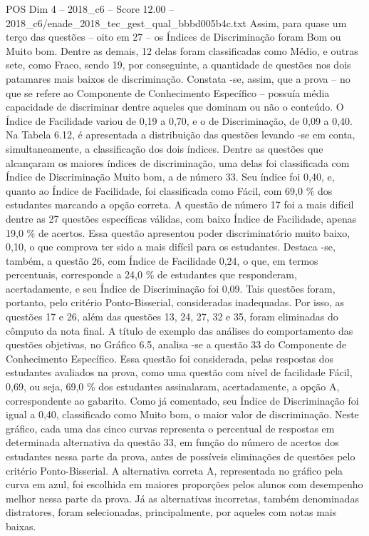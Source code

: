 \begin{textsample}{POS Dim 4 – 2018\_c6 – Score 12.00 – 2018\_c6/enade\_2018\_tec\_gest\_qual\_bbbd005b4c.txt}
Assim, para quase um terço das questões – oito em 27 – os Índices de Discriminação foram Bom ou Muito bom.
Dentre as demais, 12 delas foram classificadas como Médio, e outras sete, como Fraco, sendo 19, por conseguinte, a quantidade de questões nos dois patamares mais baixos de discriminação.
Constata -se, assim, que a prova – no que se refere ao Componente de Conhecimento Específico – possuía média capacidade de discriminar dentre aqueles que dominam ou não o conteúdo.
O Índice de Facilidade variou de 0,19 a 0,70, e o de Discriminação, de 0,09 a 0,40.
Na Tabela 6.12, é apresentada a distribuição das questões levando -se em conta, simultaneamente, a classificação dos dois índices.
Dentre as questões que alcançaram os maiores índices de discriminação, uma delas foi classificada com Índice de Discriminação Muito bom, a de número 33.
Seu índice foi 0,40, e, quanto ao Índice de Facilidade, foi classificada como Fácil, com 69,0 \% dos estudantes marcando a opção correta.
A questão de número 17 foi a mais difícil dentre as 27 questões específicas válidas, com baixo Índice de Facilidade, apenas 19,0 \% de acertos.
Essa questão apresentou poder discriminatório muito baixo, 0,10, o que comprova ter sido a mais difícil para os estudantes.
Destaca -se, também, a questão 26, com Índice de Facilidade 0,24, o que, em termos percentuais, corresponde a 24,0 \% de estudantes que responderam, acertadamente, e seu Índice de Discriminação foi 0,09.
Tais questões foram, portanto, pelo critério Ponto-Bisserial, consideradas inadequadas.
Por isso, as questões 17 e 26, além das questões 13, 24, 27, 32 e 35, foram eliminadas do cômputo da nota final.
A título de exemplo das análises do comportamento das questões objetivas, no Gráfico 6.5, analisa -se a questão 33 do Componente de Conhecimento Específico.
Essa questão foi considerada, pelas respostas dos estudantes avaliados na prova, como uma questão com nível de facilidade Fácil, 0,69, ou seja, 69,0 \% dos estudantes assinalaram, acertadamente, a opção A, correspondente ao gabarito.
Como já comentado, seu Índice de Discriminação foi igual a 0,40, classificado como Muito bom, o maior valor de discriminação.
Neste gráfico, cada uma das cinco curvas representa o percentual de respostas em determinada alternativa da questão 33, em função do número de acertos dos estudantes nessa parte da prova, antes de possíveis eliminações de questões pelo critério Ponto-Bisserial.
A alternativa correta A, representada no gráfico pela curva em azul, foi escolhida em maiores proporções pelos alunos com desempenho melhor nessa parte da prova.
Já as alternativas incorretas, também denominadas distratores, foram selecionadas, principalmente, por aqueles com notas mais baixas.

\end{textsample}
